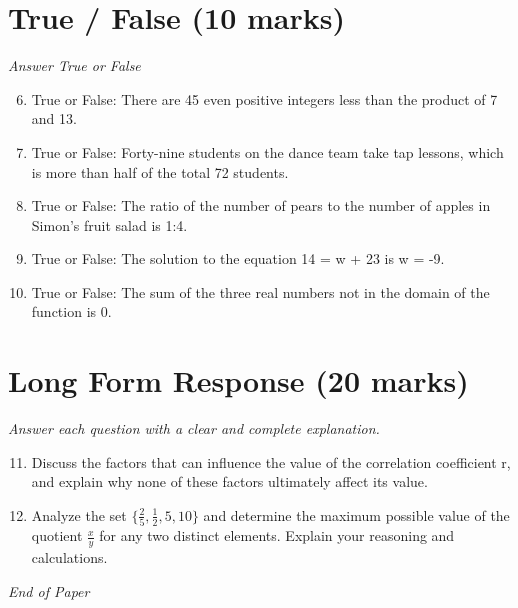 \documentclass[12pt]{article}
\begin{document}
\section*{True / False (10 marks)}
\textit{Answer True or False}
\begin{enumerate}[label=\arabic*.]
\setcounter{enumi}{5}
\item True or False: There are 45 even positive integers less than the product of 7 and 13.
\item True or False: Forty-nine students on the dance team take tap lessons, which is more than half of the total 72 students.
\item True or False: The ratio of the number of pears to the number of apples in Simon's fruit salad is 1:4.
\item True or False: The solution to the equation 14 = w + 23 is w = -9.
\item True or False: The sum of the three real numbers not in the domain of the function is 0.
\end{enumerate}

\section*{Long Form Response (20 marks)}
\textit{Answer each question with a clear and complete explanation.}
\begin{enumerate}[label=\arabic*.]
\setcounter{enumi}{10}
\item Discuss the factors that can influence the value of the correlation coefficient r, and
explain why none of these factors ultimately affect its value.
\item Analyze the set $\{\frac{2}{5}, \frac{1}{2}, 5, 10\}$ and determine the maximum possible
value of the quotient $\frac{x}{y}$ for any two distinct elements. Explain your reasoning
and calculations.
\end{enumerate}

\vfill
\noindent\textit{End of Paper}
\end{document}
